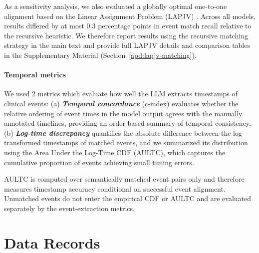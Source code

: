 \documentclass[pdflatex,sn-mathphys-num]{sn-jnl}%
\newif\ifshowrebuttalcolor
\newcommand{\rebuttal}[1]{%
  \ifshowrebuttalcolor
    \textcolor{rebuttalblue}{#1}%
  \else
    #1%
  \fi
}
\theoremstyle{thmstyleone}%
\theoremstyle{thmstyletwo}%
\theoremstyle{thmstylethree}%
\begin{document}
As a sensitivity analysis, we also evaluated a globally optimal one-to-one alignment based on the Linear Assignment Problem (LAPJV) \citep{jonker1987shortest}. Across all models, results differed by at most $0.3$ percentage points in event match recall relative to the recursive heuristic. We therefore report results using the recursive matching strategy in the main text and provide full LAPJV details and comparison tables in the Supplementary Material (Section~\ref{apd:lapjv-matching}).


\paragraph{Temporal metrics}

We used 2 metrics which evaluate how well the LLM extracts timestamps of clinical events: (a) \textbf{\emph{Temporal concordance}} (c-index) evaluates whether the relative ordering of event times in the model output agrees with the manually annotated timelines, providing an order-based summary of temporal consistency. (b) \textbf{\emph{Log-time discrepancy}} quantifies the absolute difference between the log-transformed timestamps of matched events, and we summarized its distribution using the Area Under the Log-Time CDF (AULTC), which captures the cumulative proportion of events achieving small timing errors. \rebuttal{
AULTC is computed over semantically matched event pairs only and therefore measures timestamp accuracy conditional on successful event alignment. Unmatched events do not enter the empirical CDF or AULTC and are evaluated separately by the event-extraction metrics. 
}



\section{Data Records}
\label{sec:data-records}
\end{document}
